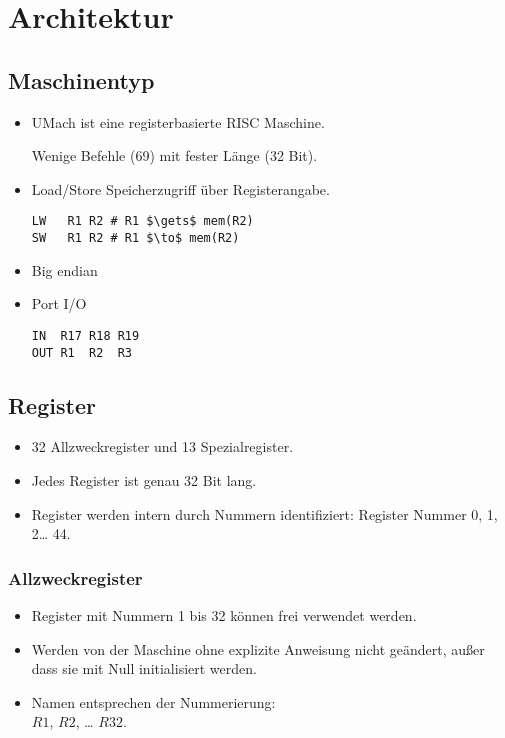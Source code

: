 \section{Architektur}

\subsection{Maschinentyp}

\begin{frame}[fragile]{\insertsubsection}
 \begin{itemize}
  \item UMach ist eine registerbasierte RISC Maschine.
        
        Wenige Befehle (69) mit fester Länge (32 Bit).        
  \item Load/Store Speicherzugriff über Registerangabe.
\begin{lstlisting}
LW   R1 R2 # R1 $\gets$ mem(R2)
SW   R1 R2 # R1 $\to$ mem(R2)
\end{lstlisting}
  \item Big endian
  \item Port I/O
\begin{lstlisting}
IN  R17 R18 R19
OUT R1  R2  R3
\end{lstlisting}
 \end{itemize}
\end{frame}


\subsection{Register}

\begin{frame}{\insertsubsection}
 \begin{itemize}
   \item 32 Allzweckregister und 13 Spezialregister.
   \item Jedes Register ist genau 32 Bit lang.
   \item Register werden intern durch Nummern identifiziert:
         Register Nummer 0, 1, 2\ldots{} 44.
 \end{itemize}
\end{frame}


\subsubsection{Allzweckregister}

\begin{frame}{\insertsubsubsection}
 \begin{itemize}
   \item Register mit Nummern 1 bis 32 können frei verwendet werden.
   \item Werden von der Maschine ohne explizite Anweisung nicht geändert, außer
         dass sie mit Null initialisiert werden.
   \item Namen entsprechen der Nummerierung:\\
         $R1$, $R2$, \ldots{} $R32$.
 \end{itemize}
\end{frame}



